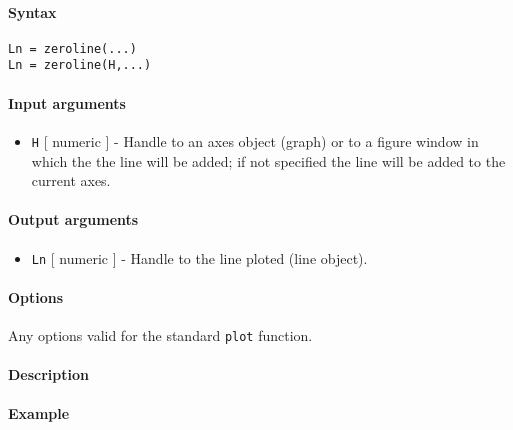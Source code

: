 


	\paragraph{Syntax}

\begin{verbatim}
Ln = zeroline(...)
Ln = zeroline(H,...)
\end{verbatim}

\paragraph{Input arguments}

\begin{itemize}
\itemsep1pt\parskip0pt
\item
  \texttt{H} {[} numeric {]} - Handle to an axes object (graph) or to a
  figure window in which the the line will be added; if not specified
  the line will be added to the current axes.
\end{itemize}

\paragraph{Output arguments}

\begin{itemize}
\itemsep1pt\parskip0pt
\item
  \texttt{Ln} {[} numeric {]} - Handle to the line ploted (line object).
\end{itemize}

\paragraph{Options}

Any options valid for the standard \texttt{plot} function.

\paragraph{Description}

\paragraph{Example}


